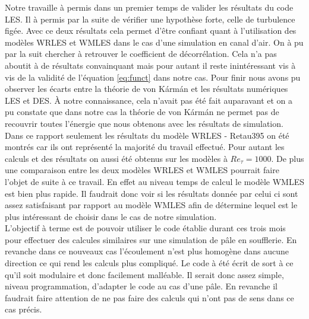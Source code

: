 \documentclass[12pt]{article}
\theoremstyle{plain}
\theoremstyle{remark}
\begin{document}
Notre travaille à permis dans un premier temps de valider les résultats du code LES. Il à permis par la suite de vérifier une hypothèse forte, celle de turbulence figée. Avec ce deux résultats cela permet d'être confiant quant à l'utilisation des modèles WRLES et WMLES dans le cas d'une simulation en canal d'air. On à pu par la suit chercher à retrouver le coefficient de décorrélation. Cela n'a pas aboutit à de résultats convainquant mais pour autant il reste inintéressant vis à vis de la validité de l'équation \ref{eq:funct} dans notre cas. Pour finir nous avons pu observer les écarts entre la théorie de von Kármán et les résultats numériques LES et DES. À notre connaissance, cela n'avait pas été fait auparavant et on a pu constate que dans notre cas la théorie de von Kármán ne permet pas de recouvrir toutes l'énergie que nous obtenons avec les résultats de simulation. \\ 
Dans ce rapport seulement les résultats du modèle WRLES - Retau395 on été montrés car ils ont représenté la majorité du travail effectué. Pour autant les calculs et des résultats on aussi été obtenus sur les modèles à $Re_{\tau}=1000$. De plus une comparaison entre les deux modèles WRLES et WMLES pourrait faire l'objet de suite à ce travail. En effet au niveau temps de calcul le modèle WMLES est bien plus rapide. Il faudrait donc voir si les résultats donnée par celui ci sont assez satisfaisant par rapport au modèle WMLES afin de détermine lequel est le plus intéressant de choisir dans le cas de notre simulation. \\
L'objectif à terme est de pouvoir utiliser le code établie durant ces trois mois pour effectuer des calcules similaires sur une simulation de pâle en soufflerie. En revanche dans ce nouveaux cas l'écoulement n'est plus homogène dans aucune direction ce qui rend les calculs plus compliqué. Le code à été écrit de sort à ce qu'il soit modulaire et donc facilement malléable. Il serait donc assez simple, niveau programmation, d'adapter le code au cas d'une pâle. En revanche il faudrait faire attention de ne pas faire des calculs qui n'ont pas de sens dans ce cas précis.

	
	
\end{document}
